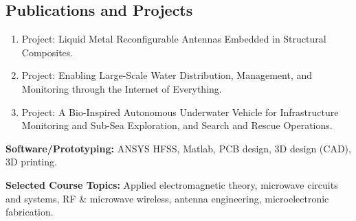 \subsection*{Publications and Projects}

\begin{enumerate}    \itemsep0pt
\item Project: Liquid Metal Reconfigurable Antennas Embedded in Structural Composites.

\item Project: Enabling Large-Scale Water Distribution, Management, and Monitoring through the Internet of Everything.

\item Project: A Bio-Inspired Autonomous Underwater Vehicle for Infrastructure Monitoring and Sub-Sea Exploration, and Search and Rescue Operations.
\end{enumerate}

\textbf{Software/Prototyping:} ANSYS HFSS, Matlab, PCB design, 3D design (CAD), 3D printing.

\textbf{Selected Course Topics:} Applied electromagnetic theory, microwave circuits and systems, RF \& microwave wireless, antenna engineering, microelectronic fabrication.

